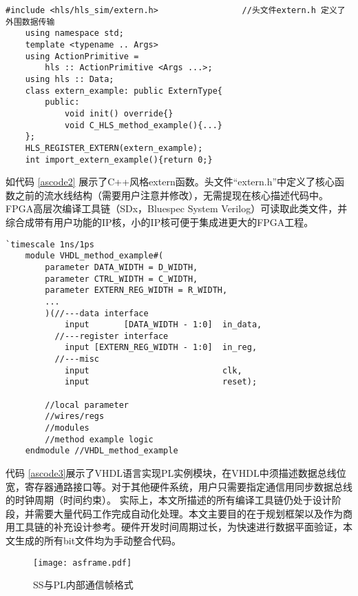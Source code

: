 {\fontsize{10pt}{0.5\baselineskip}\selectfont
	\begin{lstlisting}[caption={extern实例的C++类声明},label={ascode2}]
	#include <hls/hls_sim/extern.h>					//头文件extern.h 定义了外围数据传输
	using namespace std;
	template <typename .. Args>
	using ActionPrimitive =
		hls :: ActionPrimitive <Args ...>;
	using hls :: Data;
	class extern_example: public ExternType{
		public:
			void init() override{}
			void C_HLS_method_example(){...}
	};
	HLS_REGISTER_EXTERN(extern_example);
	int import_extern_example(){return 0;}
	\end{lstlisting}
}

如代码 \ref{ascode2} 展示了C++风格extern函数。头文件“extern.h”中定义了核心函数之前的流水线结构（需要用户注意并修改），无需提现在核心描述代码中。FPGA高层次编译工具链（SDx，Bluespec System Verilog）可读取此类文件，并综合成带有用户功能的IP核，小的IP核可便于集成进更大的FPGA工程。

{\fontsize{10pt}{0.5\baselineskip}\selectfont
	\begin{lstlisting}[caption={extern实例的VHDL模块声明},label={ascode3}]
	`timescale 1ns/1ps
	module VHDL_method_example#(
		parameter DATA_WIDTH = D_WIDTH,
		parameter CTRL_WIDTH = C_WIDTH,
		parameter EXTERN_REG_WIDTH = R_WIDTH,
		...
		)(//---data interface
			input		[DATA_WIDTH - 1:0]	in_data,
		  //---register interface
		  	input [EXTERN_REG_WIDTH - 1:0]  in_reg,
		  //---misc
		  	input							clk,
		  	input							reset);
		  	
		//local parameter
		//wires/regs
		//modules
		//method example logic
	endmodule //VHDL_method_example
	\end{lstlisting}
}

代码 \ref{ascode3}展示了VHDL语言实现PL实例模块，在VHDL中须描述数据总线位宽，寄存器通路接口等。对于其他硬件系统，用户只需要指定通信用同步数据总线的时钟周期（时间约束）。
实际上，本文所描述的所有编译工具链仍处于设计阶段，并需要大量代码工作完成自动化处理。本文主要目的在于规划框架以及作为商用工具链的补充设计参考。硬件开发时间周期过长，为快速进行数据平面验证，本文生成的所有bit文件均为手动整合代码。

\label{chap44}

\label{chap441}

\begin{figure}[!ht]
	\centering 
	\vspace{-1.5mm} 
	\texttt{[image: asframe.pdf]}
	\caption{SS与PL内部通信帧格式} \label{fig:asframe}
\end{figure}

